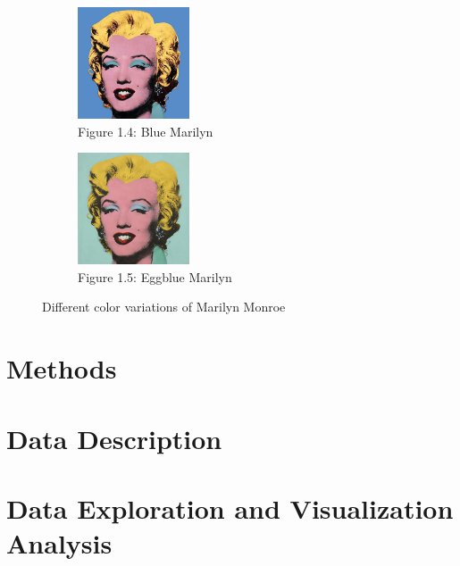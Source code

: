 \documentclass{article}
\begin{document}
\begin{figure}[ht]
  \begin{minipage}{0.6\textwidth}
    \centering
    \begin{subfigure}{0.45\textwidth}
      \centering
      \includegraphics[width=125px]{main_files/figure-latex/1_4_blue_marilyn.jpg}
      \caption{Figure 1.4: Blue Marilyn}
      \label{fig:1_4_blue_marilyn}
    \end{subfigure}
    \hfill
    \begin{subfigure}{0.45\textwidth}
      \centering
      \includegraphics[width=125px]{main_files/figure-latex/1_5_eggblue_marilyn.jpg}
      \caption{Figure 1.5: Eggblue Marilyn}
      \label{fig:1_5_eggblue_marilyn}
    \end{subfigure}
  \end{minipage}

  \caption{Different color variations of Marilyn Monroe}
  \label{fig:marilyn_variations}
\end{figure}

\hypertarget{methods}{%
\section{Methods}\label{methods}}

\hypertarget{data-description}{%
\section{Data Description}\label{data-description}}

\hypertarget{data-exploration-and-visualization-analysis}{%
\section{Data Exploration and Visualization
Analysis}\label{data-exploration-and-visualization-analysis}}
\end{document}
